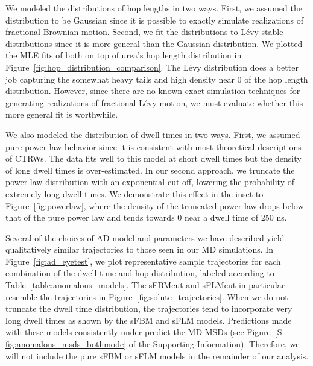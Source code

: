 \documentclass[aps,pre,preprint,groupedaddress]{revtex4-2}
\begin{document}
  We modeled the distributions of hop lengths in two ways. First, we assumed the 
  distribution to be Gaussian since it is possible to exactly simulate realizations of
  fractional Brownian motion. Second, we fit the distributions to L\'evy stable 
  distributions since it is more general than the Gaussian distribution. We plotted
  the MLE fits of both on top of urea's hop length distribution in 
  Figure~\ref{fig:hop_distribution_comparison}. The L\'evy distribution does a 
  better job capturing the somewhat heavy tails and high density near 0 of the hop
  length distribution. However, since there are no known exact simulation techniques
  for generating realizations of fractional L\'evy motion, we must evaluate whether
  this more general fit is worthwhile. 
  
  We also modeled the distribution of dwell times in two ways. First, we assumed pure
  power law behavior since it is consistent with most theoretical descriptions of CTRWs.
  The data fits well to this model at short dwell times but the density of long dwell
  times is over-estimated. In our second approach, we truncate the power law distribution
  with an exponential cut-off, lowering the probability of extremely long dwell times. 
  We demonstrate this effect in the inset to Figure~\ref{fig:powerlaw}, where the
  density of the truncated power law drops below that of the pure power law and tends towards
  0 near a dwell time of 250 ns.
  
  Several of the choices of AD model and parameters we have described 
  yield qualitatively similar trajectories to those seen in our MD simulations. 
  In
  Figure~\ref{fig:ad_eyetest}, we plot representative sample trajectories for each
  combination of the dwell time and hop distribution, labeled according to Table~\ref{table:anomalous_models}.
  The sFBMcut and sFLMcut in particular resemble the trajectories in Figure~\ref{fig:solute_trajectories}.
  When we do not truncate the dwell time distribution, the trajectories tend to 
  incorporate very long dwell times as shown by the sFBM and sFLM models. Predictions
  made with these models consistently under-predict the MD MSDs (see 
  Figure~\ref{S-fig:anomalous_msds_bothmode} of the Supporting Information). Therefore, 
  we will not include the pure sFBM or sFLM models in the remainder of our analysis.   
  
\end{document}

